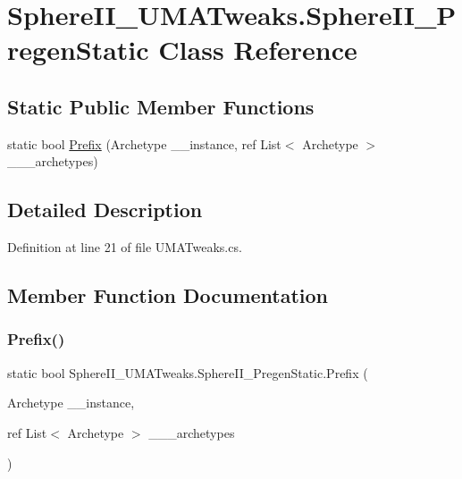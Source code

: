 \hypertarget{class_sphere_i_i___u_m_a_tweaks_1_1_sphere_i_i___pregen_static}{}\section{Sphere\+I\+I\+\_\+\+U\+M\+A\+Tweaks.\+Sphere\+I\+I\+\_\+\+Pregen\+Static Class Reference}
\label{class_sphere_i_i___u_m_a_tweaks_1_1_sphere_i_i___pregen_static}
\subsection*{Static Public Member Functions}
\begin{DoxyCompactItemize}
\item 
static bool \mbox{\hyperlink{class_sphere_i_i___u_m_a_tweaks_1_1_sphere_i_i___pregen_static_af7af6336f16d3dac15807bb6505d3d26}{Prefix}} (Archetype \+\_\+\+\_\+instance, ref List$<$ Archetype $>$ \+\_\+\+\_\+\+\_\+archetypes)
\end{DoxyCompactItemize}


\subsection{Detailed Description}


Definition at line 21 of file U\+M\+A\+Tweaks.\+cs.



\subsection{Member Function Documentation}
\mbox{\label{class_sphere_i_i___u_m_a_tweaks_1_1_sphere_i_i___pregen_static_af7af6336f16d3dac15807bb6505d3d26}} 
\subsubsection{\texorpdfstring{Prefix()}{Prefix()}}
{\footnotesize\ttfamily static bool Sphere\+I\+I\+\_\+\+U\+M\+A\+Tweaks.\+Sphere\+I\+I\+\_\+\+Pregen\+Static.\+Prefix (\begin{DoxyParamCaption}\item[{Archetype}]{\+\_\+\+\_\+instance,  }\item[{ref List$<$ Archetype $>$}]{\+\_\+\+\_\+\+\_\+archetypes }\end{DoxyParamCaption})\hspace{0.3cm}{\ttfamily [static]}}



